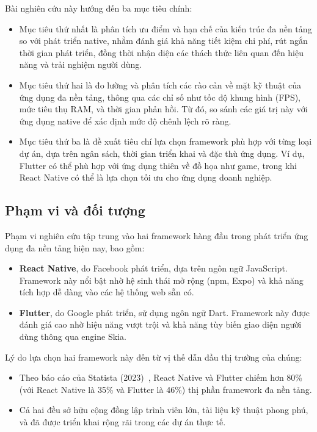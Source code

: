     Bài nghiên cứu này hướng đến ba mục tiêu chính:
    \setlength{\leftmargini}{1.0cm}
    \begin{itemize}
        \item Mục tiêu thứ nhất là phân tích ưu điểm và hạn chế của kiến trúc đa nền tảng so với phát triển native, nhằm đánh giá khả năng tiết kiệm chi phí, rút ngắn thời gian phát triển, đồng thời nhận diện các thách thức liên quan đến hiệu năng và trải nghiệm người dùng.
        \item Mục tiêu thứ hai là đo lường và phân tích các rào cản về mặt kỹ thuật của ứng dụng đa nền tảng, thông qua các chỉ số như tốc độ khung hình (FPS), mức tiêu thụ RAM, và thời gian phản hồi. Từ đó, so sánh các giá trị này với ứng dụng native để xác định mức độ chênh lệch rõ ràng.
        \item Mục tiêu thứ ba là đề xuất tiêu chí lựa chọn framework phù hợp với từng loại dự án, dựa trên ngân sách, thời gian triển khai và đặc thù ứng dụng. Ví dụ, Flutter có thể phù hợp với ứng dụng thiên về đồ họa như game, trong khi React Native có thể là lựa chọn tối ưu cho ứng dụng doanh nghiệp.
    \end{itemize}

\subsection{Phạm vi và đối tượng}
\renewcommand{\labelitemi}{--}    

    Phạm vi nghiên cứu tập trung vào hai framework hàng đầu trong phát triển ứng dụng đa nền tảng hiện nay, bao gồm:
    \setlength{\leftmargini}{1.0cm}
    \begin{itemize}
        \item \textbf{React Native}, do Facebook phát triển, dựa trên ngôn ngữ JavaScript. Framework này nổi bật nhờ hệ sinh thái mở rộng (npm, Expo) và khả năng tích hợp dễ dàng vào các hệ thống web sẵn có.
        \item \textbf{Flutter}, do Google phát triển, sử dụng ngôn ngữ Dart. Framework này được đánh giá cao nhờ hiệu năng vượt trội và khả năng tùy biến giao diện người dùng thông qua engine Skia.
    \end{itemize}
\vspace{0.5em}


    Lý do lựa chọn hai framework này đến từ vị thế dẫn đầu thị trường của chúng:
    \setlength{\leftmargini}{1.0cm}
    \begin{itemize}
        \item Theo báo cáo của Statista (2023)~\cite{slashdata2023}, React Native và Flutter chiếm hơn 80\% (với React Native là 35\% và Flutter là 46\%) thị phần framework đa nền tảng.
        \item Cả hai đều sở hữu cộng đồng lập trình viên lớn, tài liệu kỹ thuật phong phú, và đã được triển khai rộng rãi trong các dự án thực tế.
    \end{itemize}
\vspace{0.5em}


